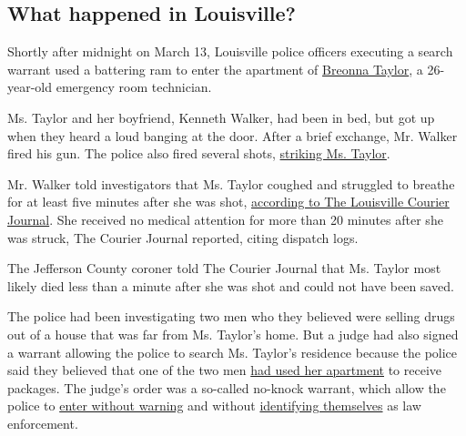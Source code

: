 \hypertarget{what-happened-in-louisville}{%
\subsection{What happened in
Louisville?}\label{what-happened-in-louisville}}

Shortly after midnight on March 13, Louisville police officers executing
a search warrant used a battering ram to enter the apartment of
\href{https://www.nytimes3xbfgragh.onion/2020/06/12/us/breonna-taylor-law-passed.html}{Breonna
Taylor}, a 26-year-old emergency room technician.

Ms. Taylor and her boyfriend, Kenneth Walker, had been in bed, but got
up when they heard a loud banging at the door. After a brief exchange,
Mr. Walker fired his gun. The police also fired several shots,
\href{https://www.nytimes3xbfgragh.onion/2020/05/14/us/breonna-taylor-louisville-shooting.html}{striking
Ms. Taylor}.

Mr. Walker told investigators that Ms. Taylor coughed and struggled to
breathe for at least five minutes after she was shot,
\href{https://www.courier-journal.com/story/news/crime/2020/07/17/breonna-taylor-lay-untouched-20-minutes-after-being-shot-records/5389881002/}{according
to The Louisville Courier Journal}. She received no medical attention
for more than 20 minutes after she was struck, The Courier Journal
reported, citing dispatch logs.

The Jefferson County coroner told The Courier Journal that Ms. Taylor
most likely died less than a minute after she was shot and could not
have been saved.

The police had been investigating two men who they believed were selling
drugs out of a house that was far from Ms. Taylor's home. But a judge
had also signed a warrant allowing the police to search Ms. Taylor's
residence because the police said they believed that one of the two men
\href{https://www.courier-journal.com/story/news/2020/05/12/breonna-taylor-louisville-emt-not-main-target-drug-investigation/3115928001/}{had
used her apartment} to receive packages. The judge's order was a
so-called no-knock warrant, which allow the police to
\href{https://www.nytimes3xbfgragh.onion/interactive/2017/03/18/us/forced-entry-warrant-drug-raid.html}{enter
without warning} and without
\href{https://www.courier-journal.com/story/news/2020/05/12/breonna-taylor-louisville-emt-not-main-target-drug-investigation/3115928001/}{identifying
themselves} as law enforcement.

